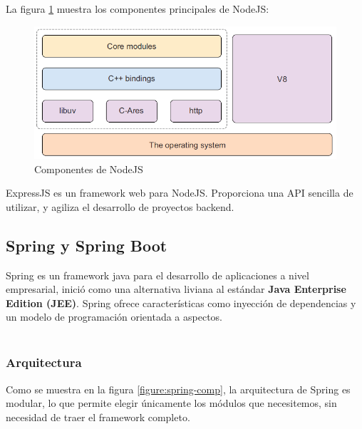 		La figura \ref{figure:nodejs-comp} muestra los componentes principales de
		NodeJS:
		
		\begin{figure}[H]
		    \centering
			\includegraphics[width=16cm]{../imgs/ejemplos/nodejs-comp.png}
			\caption{Componentes de NodeJS}
			\label{figure:nodejs-comp}
		\end{figure}
		
		
		
		ExpressJS es un framework web para NodeJS. Proporciona una API sencilla de
		utilizar, y agiliza el desarrollo de proyectos backend.
	\newpage
	
	\subsection{Spring y Spring Boot}
		Spring es un framework java para el desarrollo de aplicaciones a nivel
		empresarial, inició como una alternativa liviana al estándar {\bf Java
		Enterprise Edition (JEE)}. Spring ofrece características como inyección de
		dependencias y un modelo de programación orientada a aspectos.\\\
		
		\subsubsection{Arquitectura}
			Como se muestra en la figura \ref{figure:spring-comp}, la arquitectura de
			Spring es modular, lo que permite elegir únicamente los módulos que
			necesitemos, sin necesidad de traer el framework completo.
		
